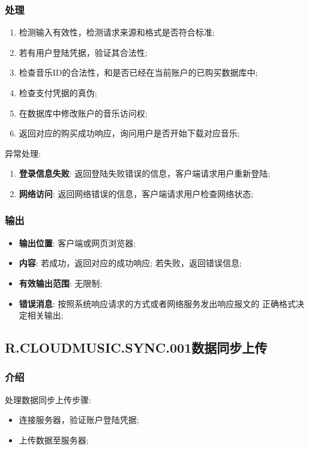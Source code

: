 \subsubsection{处理}
	\begin{enumerate}
		\item 检测输入有效性，检测请求来源和格式是否符合标准;
		\item 若有用户登陆凭据，验证其合法性;
		\item 检查音乐ID的合法性，和是否已经在当前账户的已购买数据库中;
		\item 检查支付凭据的真伪;
		\item 在数据库中修改账户的音乐访问权;
		\item 返回对应的购买成功响应，询问用户是否开始下载对应音乐;
	\end{enumerate}
	\noindent 异常处理: 
	\begin{enumerate}
		\item \textbf{登录信息失败}: 返回登陆失败错误的信息，客户端请求用户重新登陆;
		\item \textbf{网络访问}: 返回网络错误的信息，客户端请求用户检查网络状态;
	\end{enumerate}
\subsubsection{输出}
\begin{itemize}
	\item \textbf{输出位置}: 客户端或网页浏览器;
	\item \textbf{内容}: 若成功，返回对应的成功响应; 若失败，返回错误信息;
	\item \textbf{有效输出范围}: 无限制;
	\item \textbf{错误消息}: 按照系统响应请求的方式或者网络服务发出响应报文的
		正确格式决定相关输出;
\end{itemize}
\subsection{R.CLOUDMUSIC.SYNC.001数据同步上传}
\subsubsection{介绍}
	处理数据同步上传步骤:
	\begin{itemize}
		\item 连接服务器，验证账户登陆凭据;
		\item 上传数据至服务器;
	\end{itemize}
